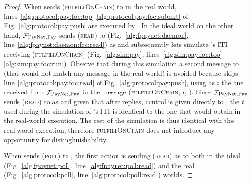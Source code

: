 \begin{proof}
  When \environment{} sends (\textsc{fulfillOnChain}) to \alice{} in the real
  world, lines~\ref{alg:protocol:pay:foc:top}-\ref{alg:protocol:pay:foc:submit}
  of Fig.~\ref{alg:protocol:pay:push} are executed by \alice. In the ideal world
  on the other hand, $\mathcal{F}_{\mathrm{PayNet}}{}_{\mathrm{, Pay}}$ sends (\textsc{read}) to
  \ledger{} (Fig.~\ref{alg:fpaynet:daemon},
  line~\ref{alg:fpaynet:daemon:foc:read}) as \alice{} and subsequently lets
  \simulator{} simulate \alice{}'s ITI receiving (\textsc{fulfillOnChain})
  (Fig.~\ref{alg:sim:pay},
  lines~\ref{alg:sim:pay:foc:top}-\ref{alg:sim:pay:foc:run}). Observe that
  during this simulation a second message to \ledger{} (that would not match any
  message in the real world) is avoided because \simulator{} skips
  line~\ref{alg:protocol:pay:foc:read} of Fig.~\ref{alg:protocol:pay:push},
  using as $t$ the one received from $\mathcal{F}_{\mathrm{PayNet}}{}_{\mathrm{, Pay}}$ in the
  message (\textsc{fulfillOnChain}, $t$, \alice). Since $\mathcal{F}_{\mathrm{PayNet}}{}_{\mathrm{,
  Pay}}$ sends (\textsc{read}) to \ledger{} as \alice{} and given that after
  \ledger{} replies, control is given directly to \simulator{}, the $t$ used
  during the simulation of \alice's ITI is identical to the one that \alice{}
  would obtain in the real-world execution. The rest of the simulation is thus
  identical with the real-world execution, therefore \textsc{fulfillOnChain}
  does not introduce any opportunity for distinghuishability.

  When \environment{} sends (\textsc{poll}) to \alice, the first action is
  sending (\textsc{read}) as \alice{} to \ledger{} both in the ideal
  (Fig.~\ref{alg:fpaynet:poll}, line~\ref{alg:fpaynet:poll:read}) and the real
  (Fig.~\ref{alg:protocol:poll}, line~\ref{alg:protocol:poll:read}) worlds.
\end{proof}
